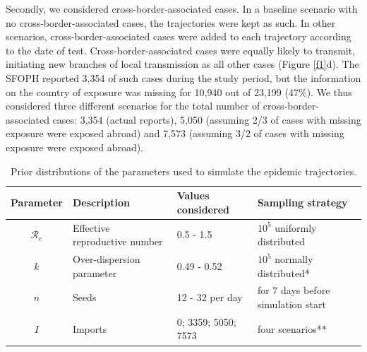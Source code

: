 \documentclass[10pt, a4paper, twoside]{article}
\begin{document}
\begin{multicols}{2}
Secondly, we considered cross-border-associated cases.
In a baseline scenario with no cross-border-associated cases, the trajectories were kept as such.
In other scenarios, cross-border-associated cases were added to each trajectory according to the date of test.
Cross-border-associated cases were equally likely to transmit, initiating new branches of local transmission as all other cases (Figure \ref{f1}d).
The SFOPH reported 3,354 of such cases during the study period, but the information on the country of exposure was missing for 10,940 out of 23,199 (47\%).
We thus considered three different scenarios for the total number of cross-border-associated cases: 3,354 (actual reports), 5,050 (assuming 2/3 of cases with missing exposure were exposed abroad) and 7,573 (assuming 3/2 of cases with missing exposure were exposed abroad).
%



\begin{table}
	\caption{Prior distributions of the parameters used to simulate the epidemic trajectories.}%
	\label{t1}
\begin{tabular}{clll}
	\hline
	Parameter & Description & Values considered & Sampling strategy\\
	\hline
	$\mathcal{R}_e$ & Effective reproductive number & 0.5 - 1.5 & $10^5$ uniformly distributed\\
	$k$ & Over-dispersion parameter & 0.49 - 0.52 & $10^5$ normally distributed*\\
	$n$ & Seeds & 12 - 32 per day & for 7 days before simulation start\\
	$I$ & Imports & 0; 3359; 5050; 7573 & four scenarios**\\
	\hline
\end{tabular}

\end{table}


\end{multicols}
\end{document}
